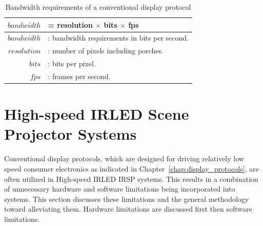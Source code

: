     \begin{table}
        \centering
        \large
        \begin{tabular}{| r l |}
            \hline
            $bandwidth$ & = resolution $\times$ bits $\times$ fps \\ \hline
            $bandwidth$ & : bandwidth requirements in bits per second. \\
            $resolution$ & : number of pixels including porches. \\
            $bits$ & : bits per pixel. \\
            $fps$ & : frames per second. \\
            \hline
        \end{tabular}
        \caption{Bandwidth requirements of a conventional display protocol}
        \label{tbl:bandwidth}
    \end{table}

\section{High-speed IRLED Scene Projector Systems}

    Conventional display protocols, which are designed for driving relatively low speed consumer electronics as indicated in Chapter~\ref{chap:display_protocols}, are often utilized in High-speed IRLED IRSP systems. This results in a combination of unnecessary hardware and software limitations being incorporated into systems. This section discusses these limitations and the general methodology toward alleviating them. Hardware limitations are discussed first then software limitations.

